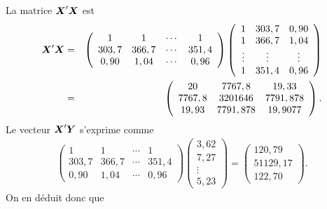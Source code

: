 La matrice $\mbox{\boldmath$X$\unboldmath}'\mbox{\boldmath$X$\unboldmath}$ est
\begin{eqnarray*}
\mbox{\boldmath$X$\unboldmath}'\mbox{\boldmath$X$\unboldmath} & = & \left(
\begin{array}{cccc}
1 & 1 & \cdots & 1 \\
303,7 & 366,7 & \cdots & 351,4 \\
0,90 & 1,04 & \cdots & 0,96
\end{array}
\right)
\left(
\begin{array}{ccc}
1 & 303,7 & 0,90 \\
1 & 366,7 & 1,04 \\
\vdots & \vdots & \vdots \\
1 & 351,4 & 0,96
\end{array}
\right) \\
& = & \left(
\begin{array}{ccc}
20 & 7767,8 & 19,33 \\
7767,8 & 3201646 & 7791,878 \\
19,93 & 7791,878 & 19,9077
\end{array}
\right).
\end{eqnarray*}
Le vecteur $\mbox{\boldmath$X$\unboldmath}'\mbox{\boldmath$Y$\unboldmath}$ s'exprime comme
\begin{eqnarray*}
\left(
\begin{array}{cccc}
1 & 1 & \cdots & 1 \\
303,7 & 366,7 & \cdots & 351,4 \\
0,90 & 1,04 & \cdots & 0,96
\end{array}
\right)
\left(
\begin{array}{c}
3,62 \\
7,27 \\
\vdots \\
5,23
\end{array}
\right)
=
\left(
\begin{array}{r}
120,79 \\
51129,17 \\
122,70
\end{array}
\right).
\end{eqnarray*}
On en déduit donc que
